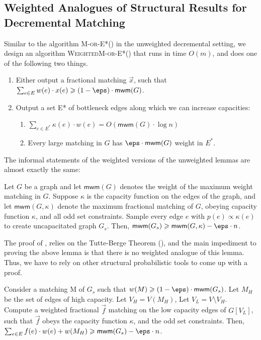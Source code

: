 \subsection{Weighted Analogues of Structural Results for Decremental Matching}

Similar to the algorithm \textsc{M-or-E*}() in the unweighted decremental setting, we design an algorithm \textsc{WeightedM-or-E*}() that runs in time $O(m)$, and does one of the following two things.

\begin{enumerate}
\item Either output a fractional matching $\vec{x}$, such that $\sum_{e\in E}w(e)\cdot x(e)\geqslant (1-\eps)\cdot \textsf{mwm}(G)$.
\item Output a set E* of bottleneck edges along which we can increase capacities:
\begin{enumerate}[label=(\roman*)]
\item $\sum_{e\in E^*}\kappa(e)\cdot w(e)=O(\textsf{mwm}(G)\cdot\log n)$
\item Every large matching in $G$ has $\eps\cdot \textsf{mwm}(G)$ weight in $E^*$.
\end{enumerate}
\end{enumerate}

The informal statements of the weighted versions of the unweighted lemmas are almost exactly the same:

\begin{lemma2}
Let $G$ be a graph and let $\textsf{mwm}(G)$ denotes the weight of the maximum weight matching in $G$. Suppose $\kappa$ is the capacity function on the edges of the graph, and let $\textsf{mwm}(G,\kappa)$ denote the maximum fractional matching of $G$, obeying capacity function $\kappa$, and all odd set constraints. Sample every edge $e$ with $p(e) \propto \kappa(e)$ to create uncapacitated graph $G_s$. Then, $\textsf{mwm}(G_s)\geqslant \textsf{mwm}(G,\kappa)-\eps\cdot n$.
\end{lemma2}

The proof of , relies on the Tutte-Berge Theorem (\cite{Schrijver2003CombinatorialOP}), and the main impediment to proving the above lemma is that there is no weighted analogue of this lemma. Thus, we have to rely on other structural probabilistic tools to come up with a proof.

\begin{lemma2}
Consider a matching M of $G_s$ such that $w(M)\geqslant (1-\eps)\cdot \textsf{mwm}(G_s)$. Let $M_H$ be the set of edges of high capacity. Let $V_H=V(M_H)$, Let $V_L=V\setminus V_H$. Compute a weighted fractional $\vec{f}$ matching on the low capacity edges of $G[V_L]$, such that $\vec{f}$ obeys the capacity function $\kappa$, and the odd set constraints. Then, $\sum_{e\in E}f(e)\cdot w(e)+w(M_H)\geqslant  \textsf{mwm}(G_s)-\eps\cdot n$.
\end{lemma2}

